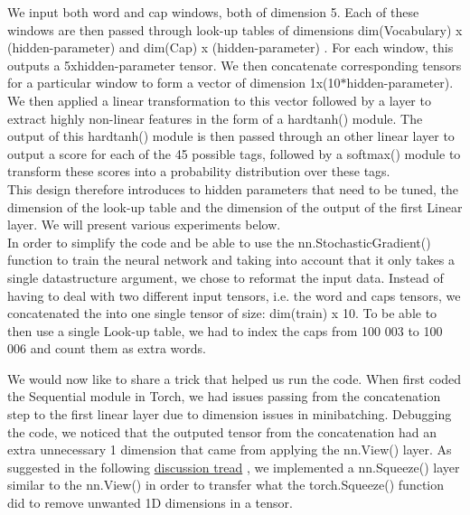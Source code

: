\documentclass[11pt]{article}
\begin{document}
\noindent We input both word and cap windows, both of dimension 5. Each of these windows are then passed through look-up tables of dimensions dim(Vocabulary) x (hidden-parameter) and dim(Cap) x (hidden-parameter) . For each window, this outputs a 5xhidden-parameter tensor. We then concatenate corresponding tensors for a particular window to form a vector of dimension 1x(10$*$hidden-parameter).\\

\noindent We then applied a linear transformation to this vector followed by a layer to extract highly non-linear features in the form of a hardtanh() module. The output of this hardtanh() module is then passed through an other linear layer  to output a score for each of the 45 possible tags, followed by a softmax() module to transform these scores into a probability distribution over these tags. \\

\noindent This design therefore introduces to hidden parameters that need to be tuned, the dimension of the look-up table and the dimension of the output of the first Linear layer. We will present various experiments below.\\

\noindent In order to simplify the code and be able to use the nn.StochasticGradient() function to train the neural network and taking into account that it only takes a single datastructure argument, we chose to reformat the input data. Instead of having to deal with two different input tensors, i.e. the word and caps tensors, we concatenated the into one single tensor of size: dim(train) x 10. To be able to then use a single Look-up table, we had to index the caps from 100 003 to 100 006 and count them as extra words.

\noindent We would now like to share a trick that helped us run the code. When first coded the Sequential module in Torch, we had issues passing from the concatenation step to the first linear layer due to dimension issues in minibatching. Debugging the code, we noticed that the outputed tensor from the concatenation had an extra unnecessary 1 dimension that came from applying the nn.View() layer. As suggested in the following \href{https://groups.google.com/forum/#!topic/torch7/u4OEc0GB74k}{discussion tread} , we implemented a nn.Squeeze() layer similar to the nn.View() in order to transfer what the torch.Squeeze() function did to remove unwanted 1D dimensions in a tensor.\\
\end{document}
